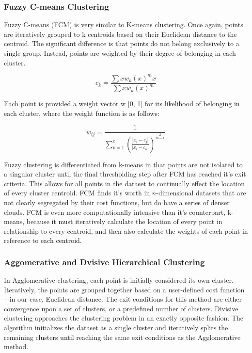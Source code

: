 \documentclass[12pt]{drexelthesis}
\let\Oldsubsubsection\subsubsection
\renewcommand{\subsubsection}{\FloatBarrier\Oldsubsubsection}
\begin{document}
\subsubsection{Fuzzy C-means Clustering}

Fuzzy C-means (FCM) is very similar to K-means clustering. Once again, points are iteratively grouped to k centroids based on their Euclidean distance to the centroid. The significant difference is that points do not belong exclusively to a single group. Instead, points are weighted by their degree of belonging in each cluster.

\begin{equation}
	c_{k} = \frac{\sum{x}w_{k}(x)^{m}x}{\sum{x}w_{k}(x)^{m}}
\end{equation}

Each point is provided a weight vector w [0, 1] for its likelihood of belonging in each cluster, where the weight function is as follows:

\begin{equation}
	w_{ij} = \frac{1}{\sum_{k=1}^{c}(\frac{|x_{i}-c_{j}|}{|x_{i}-c_{k}|})^{\frac{2}{m-1}}}
\end{equation}

Fuzzy clustering is differentiated from k-means in that points are not isolated to a singular cluster until the final thresholding step after FCM has reached it's exit criteria. This allows for all points in the dataset to continually effect the location of every cluster centroid. FCM finds it's worth in $n$-dimensional datasets that are not clearly segregated by their cost functions, but do have a series of denser clouds. FCM is even more computationally intensive than it's counterpart, k-means, because it must iteratively calculate the location of every point in relationship to every centroid, and then also calculate the weights of each point in reference to each centroid.

\subsubsection{Aggomerative and Dvisive Hierarchical Clustering}
In Agglomerative clustering, each point is initially considered its own cluster. Iteratively, the points are grouped together based on a user-defined cost function – in our case, Euclidean distance. The exit conditions for this method are either convergence upon a set of clusters, or a predefined number of clusters.
Divisive clustering approaches the clustering problem in an exactly opposite fashion. The algorithm initializes the dataset as a single cluster and iteratively splits the remaining clusters until reaching the same exit conditions as the Agglomerative method.
\end{document}
